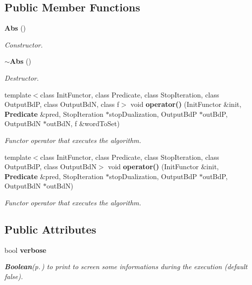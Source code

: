\subsection*{Public Member Functions}
\begin{CompactItemize}
\item 
{\bf Abs} ()\label{class_abs_b9e1bb01229ec95da6b1a5f533dd7151}

\begin{CompactList}\small\item\em Constructor. \item\end{CompactList}\item 
{\bf $\sim$Abs} ()\label{class_abs_72d51b48cb02d0fbb3815d6f8dbf67e6}

\begin{CompactList}\small\item\em Destructor. \item\end{CompactList}\item 
template$<$class Init\-Functor, class Predicate, class Stop\-Iteration, class Output\-Bd\-P, class Output\-Bd\-N, class f$>$ void {\bf operator()} (Init\-Functor \&init, {\bf Predicate} \&pred, Stop\-Iteration $\ast$stop\-Dualization, Output\-Bd\-P $\ast$out\-Bd\-P, Output\-Bd\-N $\ast$out\-Bd\-N, f \&word\-To\-Set)
\begin{CompactList}\small\item\em Functor operator that executes the algorithm. \item\end{CompactList}\item 
template$<$class Init\-Functor, class Predicate, class Stop\-Iteration, class Output\-Bd\-P, class Output\-Bd\-N$>$ void {\bf operator()} (Init\-Functor \&init, {\bf Predicate} \&pred, Stop\-Iteration $\ast$stop\-Dualization, Output\-Bd\-P $\ast$out\-Bd\-P, Output\-Bd\-N $\ast$out\-Bd\-N)
\begin{CompactList}\small\item\em Functor operator that executes the algorithm. \item\end{CompactList}\end{CompactItemize}
\subsection*{Public Attributes}
\begin{CompactItemize}
\item 
bool {\bf verbose}\label{class_abs_346a3f491c7896baa2669113764d9fa7}

\begin{CompactList}\small\item\em {\bf Boolean}{\rm (p.\,\pageref{class_boolean})} to print to screen some informations during the execution (default false). \item\end{CompactList}\end{CompactItemize}
